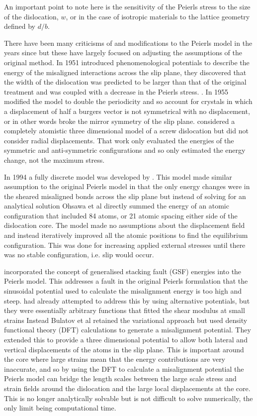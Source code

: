 An important point to note here is the sensitivity of the Peierls stress to the size of the dislocation, $w$, or in the case of isotropic materials to the lattice geometry defined by $d/b$.


There have been many criticisms of and modifications to the Peierls model in the years since but these have largely focused on adjusting the assumptions of the original method.
In 1951 \citet{Foreman1951} introduced phenomenological potentials to describe the energy of the misaligned interactions across the slip plane, they discovered that the width of the dislocation was predicted to be larger than that of the original treatment and was coupled with a decrease in the Peierls stress. .
In 1955 \citet{Huntington1955a} modified the model to double the periodicity and so account for crystals in which a displacement of half a burgers vector is not symmetrical with no displacement, or in other words broke the mirror symmetry of the slip plane. 
\citet{Maradudin1959} considered a completely atomistic three dimensional model of a screw dislocation but did not consider radial displacements. That work only evaluated the energies of the symmetric and anti-symmetric configurations and so only estimated the energy change, not the maximum stress.



In 1994 a fully discrete model was developed by \citet{Ohsawa1994}. This model made similar assumption to the original Peierls model in that the only energy changes were in the sheared misaligned bonds across the slip plane but instead of solving for an analytical solution Ohsawa et al directly summed the energy of an atomic configuration that included 84 atoms, or 21 atomic spacing either side of the dislocation core. The model made no assumptions about the displacement field and instead iteratively improved all the atomic positions to find the equilibrium configuration. This was done for increasing applied external stresses until there was no stable configuration, i.e. slip would occur.



\citet{Bulatov1997} incorporated the concept of generalised stacking fault (GSF) energies into the Peierls model. This addresses a fault in the original Peierls formulation that the sinusoidal potential used to calculate the misalignment energy is too high and steep. \citet{Ohsawa1994} had already attempted to address this by using alternative potentials, but they were essentially arbitrary functions that fitted the shear modulus at small strains Instead Bulatov et al retained the variational approach but used density functional theory (DFT) calculations to generate a misalignment potential. They extended this to provide a three dimensional potential to allow both lateral and vertical displacements of the atoms in the slip plane. This is important around the core where large strains mean that the energy contributions are very inaccurate, and so by using the DFT to calculate a misalignment potential the Peierls model can bridge the length scales between the large scale stress and strain fields around the dislocation and the large local displacements at the core. This is no longer analytically solvable but is not difficult to solve numerically, the only limit being computational time.

